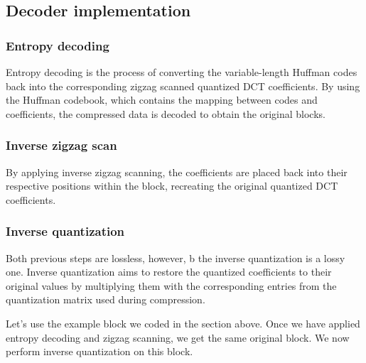 \documentclass{article}
\begin{document}
\subsection{Decoder implementation}
\subsubsection{Entropy decoding}

Entropy decoding is the process of converting the variable-length Huffman codes back into the corresponding zigzag scanned quantized DCT coefficients. By using the Huffman codebook, which contains the mapping between codes and coefficients, the compressed data is decoded to obtain the original blocks.

\subsubsection{Inverse zigzag scan}

By applying inverse zigzag scanning, the coefficients are placed back into their respective positions within the block, recreating the original quantized DCT coefficients.

\subsubsection{Inverse quantization}

Both previous steps are lossless, however,    b   the inverse quantization is a lossy one. Inverse quantization aims to restore the quantized coefficients to their original values by multiplying them with the corresponding entries from the quantization matrix used during compression.

Let's use the example block we coded in the section above. Once we have applied entropy decoding and zigzag scanning, we get the same original block. We now perform inverse quantization on this block.
\end{document}
